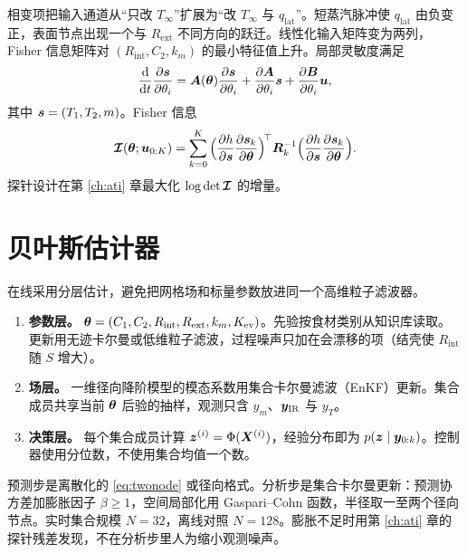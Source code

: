 相变项把输入通道从“只改 $T_\infty$”扩展为“改 $T_\infty$ 与 $q_{\mathrm{lat}}$”。短蒸汽脉冲使 $q_{\mathrm{lat}}$ 由负变正，表面节点出现一个与 $R_{\mathrm{ext}}$ 不同方向的跃迁。线性化输入矩阵变为两列，Fisher 信息矩阵对 $(R_{\mathrm{int}},C_2,k_m)$ 的最小特征值上升。局部灵敏度满足
\begin{equation}
\label{eq:sens}
\frac{\mathrm{d}}{\mathrm{d}t}\frac{\partial \bm{s}}{\partial\theta_i}
=\bm{A}(\bm{\theta})\frac{\partial \bm{s}}{\partial\theta_i}
+\frac{\partial \bm{A}}{\partial\theta_i}\bm{s}
+\frac{\partial \bm{B}}{\partial\theta_i}\bm{u},
\end{equation}
其中 $\bm{s}=(T_1,T_2,m)$。Fisher 信息
\begin{equation}
\label{eq:fisher}
\bm{\mathcal{I}}(\bm{\theta};\bm{u}_{0:K})
=\sum_{k=0}^{K}
\Big(\frac{\partial h}{\partial \bm{s}}\frac{\partial \bm{s}_k}{\partial\bm{\theta}}\Big)^{\!\top}
\bm{R}_k^{-1}
\Big(\frac{\partial h}{\partial \bm{s}}\frac{\partial \bm{s}_k}{\partial\bm{\theta}}\Big).
\end{equation}
探针设计在第 \ref{ch:ati} 章最大化 $\log\det\bm{\mathcal{I}}$ 的增量。

\section{贝叶斯估计器}

在线采用分层估计，避免把网格场和标量参数放进同一个高维粒子滤波器。

\begin{enumerate}
\item \textbf{参数层。} $\bm{\theta}=(C_1,C_2,R_{\mathrm{int}},R_{\mathrm{ext}},k_m,K_{\mathrm{ev}})$。先验按食材类别从知识库读取。更新用无迹卡尔曼或低维粒子滤波，过程噪声只加在会漂移的项（结壳使 $R_{\mathrm{int}}$ 随 $S$ 增大）。
\item \textbf{场层。} 一维径向降阶模型的模态系数用集合卡尔曼滤波（EnKF）更新。集合成员共享当前 $\bm{\theta}$ 后验的抽样，观测只含 $y_m$、$\bm{y}_{\mathrm{IR}}$ 与 $y_T$。
\item \textbf{决策层。} 每个集合成员计算 $\bm{z}^{(i)}=\Phi(\bm{X}^{(i)})$，经验分布即为 $p(\bm{z}\mid\bm{y}_{0:k})$。控制器使用分位数，不使用集合均值一个数。
\end{enumerate}

预测步是离散化的 \eqref{eq:twonode} 或径向格式。分析步是集合卡尔曼更新：预测协方差加膨胀因子 $\beta\ge 1$，空间局部化用 Gaspari--Cohn 函数，半径取一至两个径向节点。实时集合规模 $N=32$，离线对照 $N=128$。膨胀不足时用第 \ref{ch:ati} 章的探针残差发现，不在分析步里人为缩小观测噪声。


